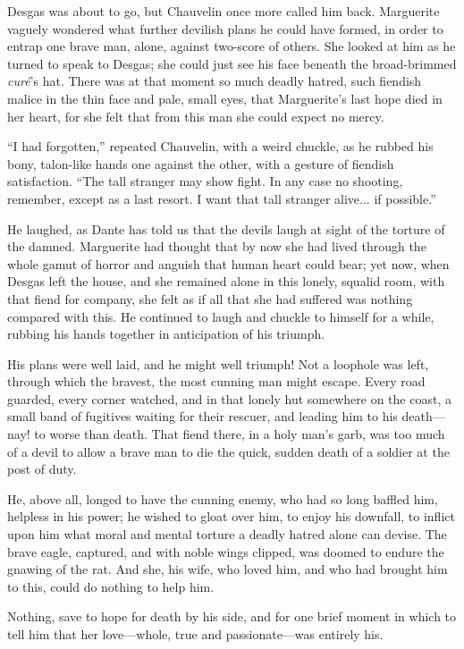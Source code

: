 \documentclass[paper=5.5in:8.5in,BCOR=7mm,twoside,DIV=calc,12pt,usegeometry,chapterprefix,endperiod,headings=big]{scrbook}
\begin{document}
Desgas was about to go, but Chauvelin once more called him back. Marguerite vaguely wondered what further devilish plans he could have formed, in order to entrap one brave man, alone, against two-score of others. She looked at him as he turned to speak to Desgas; she could just see his face beneath the broad-brimmed \textit{curé}'s hat. There was at that moment so much deadly hatred, such fiendish malice in the thin face and pale, small eyes, that Marguerite's last hope died in her heart, for she felt that from this man she could expect no mercy.

\enquote{I had forgotten,} repeated Chauvelin, with a weird chuckle, as he rubbed his bony, talon-like hands one against the other, with a gesture of fiendish satisfaction. \enquote{The tall stranger may show fight. In any case no shooting, remember, except as a last resort. I want that tall stranger alive... if possible.}

He laughed, as Dante has told us that the devils laugh at sight of the torture of the damned. Marguerite had thought that by now she had lived through the whole gamut of horror and anguish that human heart could bear; yet now, when Desgas left the house, and she remained alone in this lonely, squalid room, with that fiend for company, she felt as if all that she had suffered was nothing compared with this. He continued to laugh and chuckle to himself for a while, rubbing his hands together in anticipation of his triumph.

His plans were well laid, and he might well triumph! Not a loophole was left, through which the bravest, the most cunning man might escape. Every road guarded, every corner watched, and in that lonely hut somewhere on the coast, a small band of fugitives waiting for their rescuer, and leading him to his death---nay! to worse than death. That fiend there, in a holy man's garb, was too much of a devil to allow a brave man to die the quick, sudden death of a soldier at the post of duty.

He, above all, longed to have the cunning enemy, who had so long baffled him, helpless in his power; he wished to gloat over him, to enjoy his downfall, to inflict upon him what moral and mental torture a deadly hatred alone can devise. The brave eagle, captured, and with noble wings clipped, was doomed to endure the gnawing of the rat. And she, his wife, who loved him, and who had brought him to this, could do nothing to help him.

Nothing, save to hope for death by his side, and for one brief moment in which to tell him that her love---whole, true and passionate---was entirely his.
\end{document}
